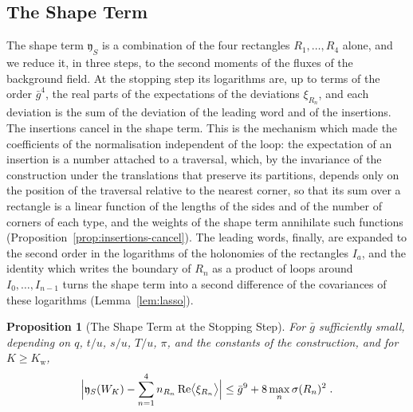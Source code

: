 \documentclass[11pt]{preprint}
\numberwithin{equation}{section}
\newtheorem{proposition}[theorem]{Proposition}
\theoremstyle{definition}
\theoremstyle{remark}
\theoremstyle{plain}
\begin{document}
\subsection{The Shape Term}\label{sec:shape-term}

The shape term $\mathfrak y_S$ is a combination of the four rectangles $R_1, \dots, R_4$ alone, and we reduce it, in three steps, to the second moments of the fluxes of the background field. At the stopping step its logarithms are, up to terms of the order $\bar g^4$, the real parts of the expectations of the deviations $\xi_{R_n}$, and each deviation is the sum of the deviation of the leading word and of the insertions. The insertions cancel in the shape term. This is the mechanism which made the coefficients of the normalisation independent of the loop: the expectation of an insertion is a number attached to a traversal, which, by the invariance of the construction under the translations that preserve its partitions, depends only on the position of the traversal relative to the nearest corner, so that its sum over a rectangle is a linear function of the lengths of the sides and of the number of corners of each type, and the weights of the shape term annihilate such functions (Proposition~\ref{prop:insertions-cancel}). The leading words, finally, are expanded to the second order in the logarithms of the holonomies of the rectangles $I_a$, and the identity which writes the boundary of $R_n$ as a product of loops around $I_0, \dots, I_{n-1}$ turns the shape term into a second difference of the covariances of these logarithms (Lemma~\ref{lem:lasso}).

\begin{proposition}[The Shape Term at the Stopping Step]\label{prop:shape-stopping}
For $\bar g$ sufficiently small, depending on $q$, $t/u$, $s/u$, $T/u$, $\pi$, and the constants of the construction, and for $K \geq K_{\mathrm w}$,
\begin{equation}\label{eq:shape-stopping}
    \Bigl\lvert\mathfrak y_S(W_K) - \sum_{n=1}^{4}n_{R_n}\operatorname{Re}\bigl\langle\xi_{R_n}\bigr\rangle\Bigr\rvert \leq \bar g^9 + 8\max_n\sigma(R_n)^2\;.
\end{equation}
\end{proposition}
\end{document}
